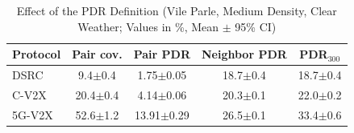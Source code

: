 \begin{table}[t]
\caption{Effect of the PDR Definition (Vile Parle, Medium Density, Clear Weather; Values in \%, Mean $\pm$ 95\% CI)}
\label{tab:pdrdef}
\centering\footnotesize
\setlength{\tabcolsep}{2pt}
\begin{tabular}{@{}lcccc@{}}
\toprule
Protocol & Pair cov. & Pair PDR & Neighbor PDR & PDR$_{300}$ \\
\midrule
DSRC & 9.4$\pm$0.4 & 1.75$\pm$0.05 & 18.7$\pm$0.4 & 18.7$\pm$0.4 \\
C-V2X & 20.4$\pm$0.4 & 4.14$\pm$0.06 & 20.3$\pm$0.1 & 22.0$\pm$0.2 \\
5G-V2X & 52.6$\pm$1.2 & 13.91$\pm$0.29 & 26.5$\pm$0.1 & 33.4$\pm$0.6 \\
\bottomrule
\end{tabular}
\end{table}
